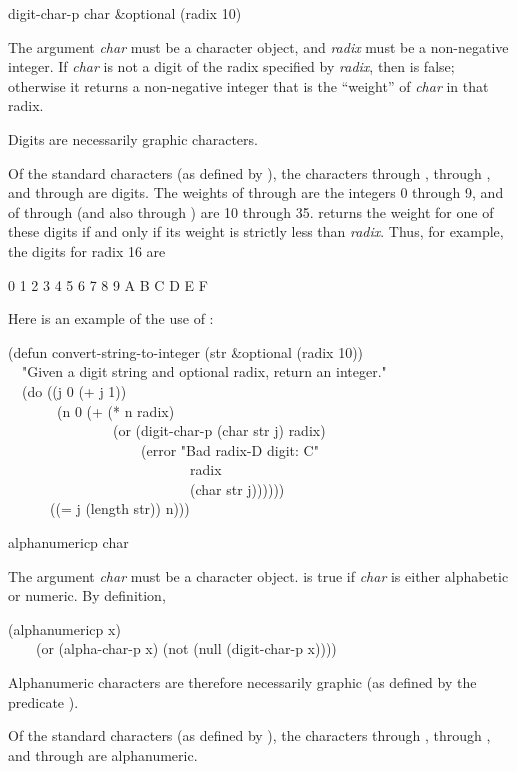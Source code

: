 \begin{defun}[Function]
digit-char-p char &optional (radix 10)

The argument \emph{char} must be a character object,
and \emph{radix} must be a non-negative integer.
If \emph{char} is not a digit of the radix
specified by \emph{radix}, then  is
false; otherwise it returns
a non-negative integer that is the ``weight'' of \emph{char} in that radix.

Digits are necessarily graphic characters.

Of the standard characters (as defined by ),
the characters  through ,  through ,
and  through 
are digits.  The weights of  through  are the integers 0 through 9,
and of  through  (and also  through ) are 10 through 35.
 returns the weight for one of these digits if and only if
its weight is strictly less than \emph{radix}.  Thus, for example,
the digits for radix 16 are
\begin{lisp}
0  1  2  3  4  5  6  7  8  9  A  B  C  D  E  F
\end{lisp}

Here is an example of the use of :
\begin{lisp}
(defun convert-string-to-integer (str \&optional (radix 10)) \\
~~"Given a digit string and optional radix, return an integer." \\
~~(do ((j 0 (+ j 1)) \\
~~~~~~~(n 0 (+ (* n radix) \\
~~~~~~~~~~~~~~~(or (digit-char-p (char str j) radix) \\
~~~~~~~~~~~~~~~~~~~(error "Bad radix-{\Xtilde}D digit: {\Xtilde}C" \\
~~~~~~~~~~~~~~~~~~~~~~~~~~radix \\
~~~~~~~~~~~~~~~~~~~~~~~~~~(char str j)))))) \\
~~~~~~((= j (length str)) n)))
\end{lisp}
\end{defun}

\begin{defun}[Function]
alphanumericp char

The argument \emph{char} must be a character object.
 is true if \emph{char} is either alphabetic
or numeric.  By definition,
\begin{lisp}
(alphanumericp x) \\
~~~\EQ\ (or (alpha-char-p x) (not (null (digit-char-p x))))
\end{lisp}
Alphanumeric characters are therefore necessarily graphic
(as defined by the predicate ).

Of the standard characters (as defined by ),
the characters  through ,  through ,
and  through  are alphanumeric.
\end{defun}

